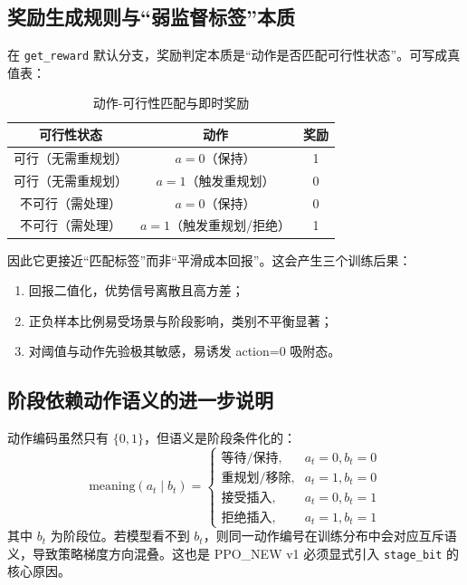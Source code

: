 ﻿\documentclass[11pt,a4paper]{ctexart}
\begin{document}
\subsection{奖励生成规则与“弱监督标签”本质}
在 \texttt{get\_reward} 默认分支，奖励判定本质是“动作是否匹配可行性状态”。可写成真值表：
\begin{table}[H]
\centering
\caption{动作-可行性匹配与即时奖励}
\begin{tabular}{ccc}
\toprule
可行性状态 & 动作 & 奖励 \\
\midrule
可行（无需重规划） & $a=0$（保持） & 1 \\
可行（无需重规划） & $a=1$（触发重规划） & 0 \\
不可行（需处理） & $a=0$（保持） & 0 \\
不可行（需处理） & $a=1$（触发重规划/拒绝） & 1 \\
\bottomrule
\end{tabular}
\end{table}

因此它更接近“匹配标签”而非“平滑成本回报”。这会产生三个训练后果：
\begin{enumerate}[leftmargin=*]
  \item 回报二值化，优势信号离散且高方差；
  \item 正负样本比例易受场景与阶段影响，类别不平衡显著；
  \item 对阈值与动作先验极其敏感，易诱发 action=0 吸附态。
\end{enumerate}

\subsection{阶段依赖动作语义的进一步说明}
动作编码虽然只有 \(\{0,1\}\)，但语义是阶段条件化的：
\begin{equation}
\text{meaning}(a_t\mid b_t)=
\begin{cases}
\text{等待/保持},&a_t=0,b_t=0\\
\text{重规划/移除},&a_t=1,b_t=0\\
\text{接受插入},&a_t=0,b_t=1\\
\text{拒绝插入},&a_t=1,b_t=1
\end{cases}
\end{equation}
其中 $b_t$ 为阶段位。若模型看不到 $b_t$，则同一动作编号在训练分布中会对应互斥语义，导致策略梯度方向混叠。这也是 PPO\_NEW v1 必须显式引入 \texttt{stage\_bit} 的核心原因。
\end{document}
